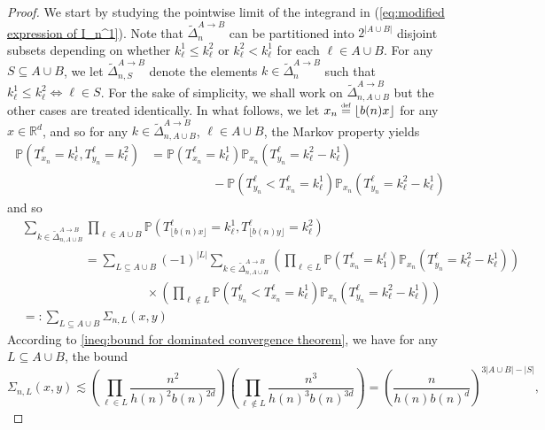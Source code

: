 \documentclass[10pt,a4paper]{amsart}
\newcommand{\RR}{\mathbb R}
\newcommand{\PP}{\mathbb P}
\newcommand{\1}{\mathds{1}}
\newcommand{\eqdef}{\stackrel{\scaleto{\mathrm{def}}{3.5pt}}{=}}
\numberwithin{equation}{section}
\begin{document}
\begin{proof}
    We start by studying the pointwise limit of the integrand in (\ref{eq:modified expression of I_n^1}). Note that $\widetilde\Delta_n^{A\rightarrow B}$ can be partitioned into $2^{|A\cup B|}$ disjoint subsets depending on whether $k_\ell^1\le k_\ell^2$ or $k_\ell^2<k_\ell^1$ for each $\ell\in A\cup B$. For any $S\subseteq A\cup B$, we let $\widetilde \Delta_{n,S}^{A\rightarrow B}$ denote the elements $k\in\widetilde\Delta_n^{A\rightarrow B}$ such that $k_\ell^1\le k_\ell^2\iff \ell\in S$. For the sake of simplicity, we shall work on $\widetilde\Delta_{n,A\cup B}^{A\rightarrow B}$ but the other cases are treated identically. In what follows, we let $x_n\eqdef\lfloor b(n) x\rfloor$ for any $x\in\RR^d$, and so for any $k\in\widetilde\Delta_{n,A\cup B}^{A\rightarrow B}$, $\ell\in A\cup B$, the Markov property yields
    \begin{align*}
        \PP\left(T_{x_n}^\ell=k_\ell^1,T_{y_n}^\ell=k_\ell^2\right)&=\PP\left(T_{x_n}^\ell=k_\ell^1\right)\PP_{x_n}\left(T_{y_n}^\ell=k_\ell^2-k_\ell^1\right)\\
        &\hspace{5em}-\PP\left(T_{y_n}^\ell<T_{x_n}^\ell=k^1_\ell \right)\PP_{x_n}(T_{y_n}^\ell=k_\ell^2-k_\ell^1)
    \end{align*}
    and so
    \begin{align*}
        &\sum_{k\in\widetilde\Delta_{n,A\cup B}^{A\rightarrow B}}\prod_{\ell\in A\cup B}\PP\left(T_{\lfloor b(n)x\rfloor}^{\ell}=k^1_{\ell},T_{\lfloor b(n)y\rfloor}^{\ell}=k_\ell^2\right)\\
        &\hspace{5em}=\sum_{L\subseteq A\cup B}(-1)^{|L|}\sum_{k\in\widetilde\Delta_{n,A\cup B}^{A\rightarrow B}}\left(\prod_{\ell\in L}\PP\left(T_{x_n}^\ell=k_1^\ell\right)\PP_{x_n}\left(T_{y_n}^\ell=k_\ell^2-k_\ell^1\right)\right)\\
        &\hspace{10em}\times\left(\prod_{\ell\notin L}\PP\left(T_{y_n}^\ell<T_{x_n}^\ell=k^1_\ell \right)\PP_{x_n}(T_{y_n}^\ell=k_\ell^2-k_\ell^1)\right)\\
        &=:\sum_{L\subseteq A\cup B}\Sigma_{n,L}(x,y)
    \end{align*}
    According to \eqref{ineq:bound for dominated convergence theorem}, we have for any $L\subseteq A\cup B$, the bound
    \begin{equation*}
        \Sigma_{n,L}(x,y)\lesssim\left(\prod_{\ell\in L}\frac{n^2}{h(n)^2b(n)^{2d}}\right)\left(\prod_{\ell\notin L}\frac{n^3}{h(n)^3b(n)^{3d}}\right)=\left(\frac{n}{h(n)b(n)^d}\right)^{3|A\cup B|-|S|},

\end{equation*}
\end{proof}
\end{document}
